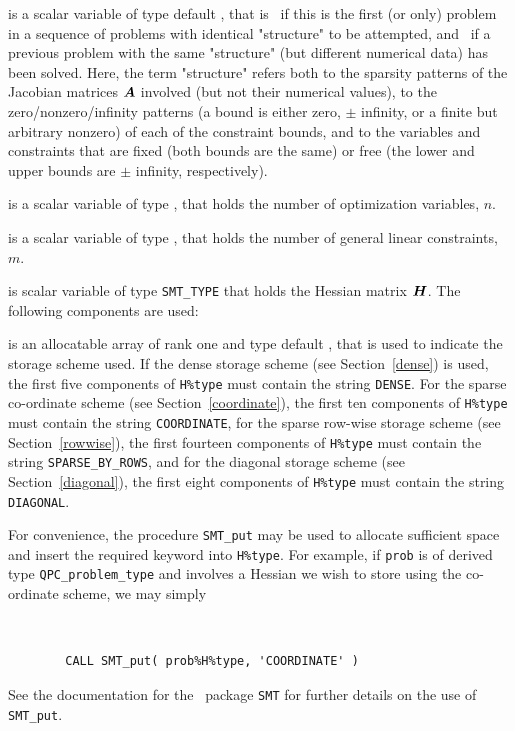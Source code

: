 \documentclass{galahad}
\newcommand{\packagename}{QPC}
\begin{document}
\begin{description}

 is a scalar variable of type default \logical, 
 that is \true\ if this is the first (or only) problem in a sequence of 
 problems with identical "structure" to be attempted, and \false\ if 
 a previous problem with the same "structure" (but different
 numerical data) has been solved. Here, the term "structure" refers both to 
 the sparsity patterns of the Jacobian matrices ${\bm{A}}$ involved 
 (but not their numerical values), to the zero/nonzero/infinity patterns 
 (a bound is either zero, $\pm$ infinity, or a finite but arbitrary 
 nonzero) of each of the constraint bounds, and to the variables and constraints
 that are fixed (both bounds are the same) or free (the lower and upper
 bounds are $\pm$ infinity, respectively).

 is a scalar variable of type \integer, 
 that holds the number of optimization variables, $n$.  
              
 is a scalar variable of type \integer, 
 that holds the number of general linear constraints, $m$.
              
 is scalar variable of type {\tt SMT\_TYPE} 
that holds the Hessian matrix ${\bm{H}}$. The following components
are used:

\begin{description}

 is an allocatable array of rank one and type default \character, that
is used to indicate the storage scheme used. If the dense storage scheme 
(see Section~\ref{dense}) is used, 
the first five components of {\tt H\%type} must contain the
string {\tt DENSE}.
For the sparse co-ordinate scheme (see Section~\ref{coordinate}), 
the first ten components of {\tt H\%type} must contain the
string {\tt COORDINATE},  
for the sparse row-wise storage scheme (see Section~\ref{rowwise}),
the first fourteen components of {\tt H\%type} must contain the
string {\tt SPARSE\_BY\_ROWS},
and for the diagonal storage scheme (see Section~\ref{diagonal}),
the first eight components of {\tt H\%type} must contain the
string {\tt DIAGONAL}.

For convenience, the procedure {\tt SMT\_put} 
may be used to allocate sufficient space and insert the required keyword
into {\tt H\%type}.
For example, if {\tt prob} is of derived type {\tt \packagename\_problem\_type}
and involves a Hessian we wish to store using the co-ordinate scheme,
we may simply
{\tt 
\begin{verbatim}
        CALL SMT_put( prob%H%type, 'COORDINATE' )
\end{verbatim}
}
\noindent
See the documentation for the \galahad\ package {\tt SMT} 
for further details on the use of {\tt SMT\_put}.


\end{description}
\end{description}
\end{document}
